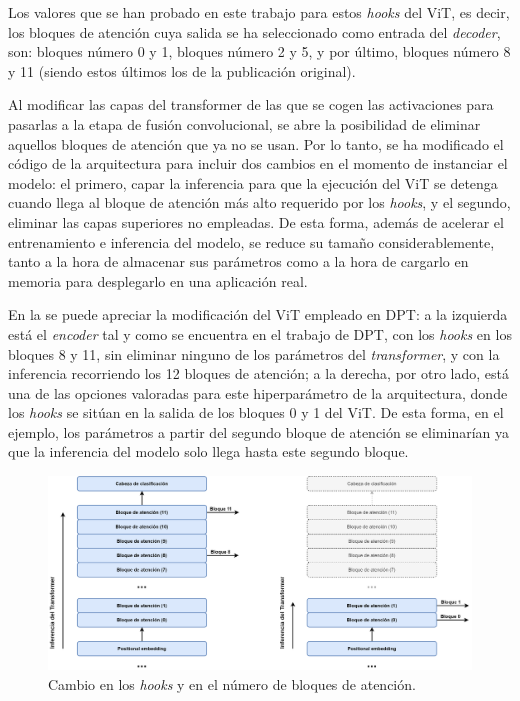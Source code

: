 Los valores que se han probado en este trabajo para estos \textit{hooks} del ViT, es decir, los bloques de atención cuya salida se ha seleccionado como entrada del \textit{decoder}, son: bloques número 0 y 1, bloques número 2 y 5, y por último, bloques número 8 y 11 (siendo estos últimos los de la publicación original).

Al modificar las capas del transformer de las que se cogen las activaciones para pasarlas a la etapa de fusión convolucional, se abre la posibilidad de eliminar aquellos bloques de atención que ya no se usan. Por lo tanto, se ha modificado el código de la arquitectura para incluir dos cambios en el momento de instanciar el modelo: el primero, capar la inferencia para que la ejecución del ViT se detenga cuando llega al bloque de atención más alto requerido por los \textit{hooks}, y el segundo, eliminar las capas superiores no empleadas. De esta forma, además de acelerar el entrenamiento e inferencia del modelo, se reduce su tamaño considerablemente, tanto a la hora de almacenar sus parámetros como a la hora de cargarlo en memoria para desplegarlo en una aplicación real. 

En la  se puede apreciar la modificación del ViT empleado en DPT: a la izquierda está el \textit{encoder} tal y como se encuentra en el trabajo de DPT, con los \textit{hooks} en los bloques 8 y 11, sin eliminar ninguno de los parámetros del \textit{transformer}, y con la inferencia recorriendo los 12 bloques de atención; a la derecha, por otro lado, está una de las opciones valoradas para este hiperparámetro de la arquitectura, donde los \textit{hooks} se sitúan en la salida de los bloques 0 y 1 del ViT. De esta forma, en el ejemplo, los parámetros a partir del segundo bloque de atención se eliminarían ya que la inferencia del modelo solo llega hasta este segundo bloque.

\begin{figure}[H]
\centering
\includegraphics[width=\textwidth]{imagenes/DPT-cambio-bloques-transformer.png}
\caption{Cambio en los \textit{hooks} y en el número de bloques de atención.}
\label{fig:attention_block_num}
\end{figure}


